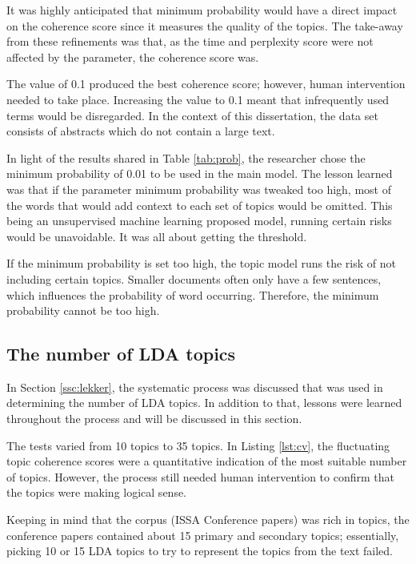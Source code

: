 It was highly anticipated that minimum probability would have a direct impact on the coherence score since it measures the quality of the topics. The take-away from these refinements was that, as the time and perplexity score were not affected by the parameter, the coherence score was.

The value of 0.1 produced the best coherence score; however, human intervention needed to take place. Increasing the value to 0.1 meant that infrequently used terms would be disregarded. In the context of this dissertation, the data set consists of abstracts which do not contain a large text.

In light of the results shared in Table \ref{tab:prob}, the researcher chose the minimum probability of 0.01 to be used in the main model. The lesson learned was that if the parameter minimum probability was tweaked too high, most of the words that would add context to each set of topics would be omitted. This being an unsupervised machine learning proposed model, running certain risks would be unavoidable. It was all about getting the threshold.

\begin{lesson}
If the minimum probability is set too high, the topic model runs the risk of not including certain topics. Smaller documents often only have a few sentences, which influences the probability of word occurring. Therefore, the minimum probability cannot be too high.
\end{lesson}\label{L:probability}

\subsection{The number of LDA topics}

In Section \ref{ssc:lekker}, the systematic process was discussed that was used in determining the number of LDA topics. In addition to that, lessons were learned throughout the process and will be discussed in this section.

The tests varied from 10 topics to 35 topics. In Listing \ref{lst:cv}, the fluctuating topic coherence scores were a quantitative indication of the most suitable number of topics. However, the process still needed human intervention to confirm that the topics were making logical sense.

Keeping in mind that the corpus (ISSA Conference papers) was rich in topics, the conference papers contained about 15 primary and secondary topics; essentially, picking 10 or 15 LDA topics to try to represent the topics from the text failed.

